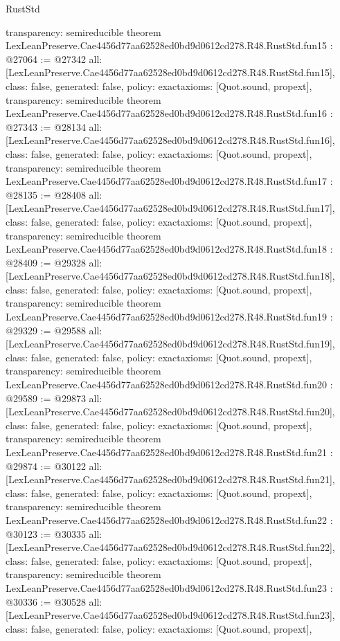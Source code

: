 \begin{lexlean}{RustStd}
\begin{coremodule}
{  transparency: semireducible
}
theorem LexLeanPreserve.Cae4456d77aa62528ed0bd9d0612cd278.R48.RustStd.fun15 : @27064 := @27342 {
  all: [LexLeanPreserve.Cae4456d77aa62528ed0bd9d0612cd278.R48.RustStd.fun15],
  class: false,
  generated: false,
  policy: exact{axioms: [Quot.sound, propext]},
  transparency: semireducible
}
theorem LexLeanPreserve.Cae4456d77aa62528ed0bd9d0612cd278.R48.RustStd.fun16 : @27343 := @28134 {
  all: [LexLeanPreserve.Cae4456d77aa62528ed0bd9d0612cd278.R48.RustStd.fun16],
  class: false,
  generated: false,
  policy: exact{axioms: [Quot.sound, propext]},
  transparency: semireducible
}
theorem LexLeanPreserve.Cae4456d77aa62528ed0bd9d0612cd278.R48.RustStd.fun17 : @28135 := @28408 {
  all: [LexLeanPreserve.Cae4456d77aa62528ed0bd9d0612cd278.R48.RustStd.fun17],
  class: false,
  generated: false,
  policy: exact{axioms: [Quot.sound, propext]},
  transparency: semireducible
}
theorem LexLeanPreserve.Cae4456d77aa62528ed0bd9d0612cd278.R48.RustStd.fun18 : @28409 := @29328 {
  all: [LexLeanPreserve.Cae4456d77aa62528ed0bd9d0612cd278.R48.RustStd.fun18],
  class: false,
  generated: false,
  policy: exact{axioms: [Quot.sound, propext]},
  transparency: semireducible
}
theorem LexLeanPreserve.Cae4456d77aa62528ed0bd9d0612cd278.R48.RustStd.fun19 : @29329 := @29588 {
  all: [LexLeanPreserve.Cae4456d77aa62528ed0bd9d0612cd278.R48.RustStd.fun19],
  class: false,
  generated: false,
  policy: exact{axioms: [Quot.sound, propext]},
  transparency: semireducible
}
theorem LexLeanPreserve.Cae4456d77aa62528ed0bd9d0612cd278.R48.RustStd.fun20 : @29589 := @29873 {
  all: [LexLeanPreserve.Cae4456d77aa62528ed0bd9d0612cd278.R48.RustStd.fun20],
  class: false,
  generated: false,
  policy: exact{axioms: [Quot.sound, propext]},
  transparency: semireducible
}
theorem LexLeanPreserve.Cae4456d77aa62528ed0bd9d0612cd278.R48.RustStd.fun21 : @29874 := @30122 {
  all: [LexLeanPreserve.Cae4456d77aa62528ed0bd9d0612cd278.R48.RustStd.fun21],
  class: false,
  generated: false,
  policy: exact{axioms: [Quot.sound, propext]},
  transparency: semireducible
}
theorem LexLeanPreserve.Cae4456d77aa62528ed0bd9d0612cd278.R48.RustStd.fun22 : @30123 := @30335 {
  all: [LexLeanPreserve.Cae4456d77aa62528ed0bd9d0612cd278.R48.RustStd.fun22],
  class: false,
  generated: false,
  policy: exact{axioms: [Quot.sound, propext]},
  transparency: semireducible
}
theorem LexLeanPreserve.Cae4456d77aa62528ed0bd9d0612cd278.R48.RustStd.fun23 : @30336 := @30528 {
  all: [LexLeanPreserve.Cae4456d77aa62528ed0bd9d0612cd278.R48.RustStd.fun23],
  class: false,
  generated: false,
  policy: exact{axioms: [Quot.sound, propext]},
}
\end{coremodule}
\end{lexlean}
